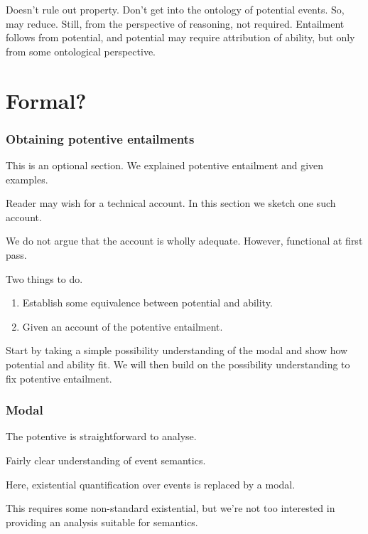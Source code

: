 \begin{note}[???]
  Doesn't rule out property.
  Don't get into the ontology of potential events.
  So, may reduce.
  Still, from the perspective of reasoning, not required.
  Entailment follows from potential, and potential may require attribution of ability, but only from some ontological perspective.
\end{note}


\section{Formal?}
\label{sec:formal}

\subsubsection{Obtaining potentive entailments}
\label{sec:obta-potent-enta}

\begin{note}
  This is an optional section.
  We explained potentive entailment and given examples.

  Reader may wish for a technical account.
  In this section we sketch one such account.

  We do not argue that the account is wholly adequate.
  However, functional at first pass.

  Two things to do.
  \begin{enumerate}
  \item Establish some equivalence between potential and ability.
  \item Given an account of the potentive entailment.
  \end{enumerate}

  Start by taking a simple possibility understanding of the modal and show how potential and ability fit.
  We will then build on the possibility understanding to fix potentive entailment.
\end{note}

\subsubsection{Modal}
\label{sec:modal}

\begin{note}[Potentive]
  The potentive is straightforward to analyse.

  Fairly clear understanding of event semantics.

  Here, existential quantification over events is replaced by a modal.

  This requires some non-standard existential, but we're not too interested in providing an analysis suitable for semantics.
\end{note}

